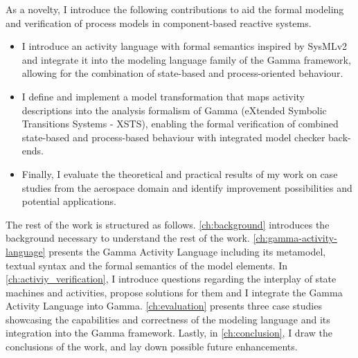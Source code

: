 As a novelty, I introduce the following contributions to aid the formal modeling and verification of process models in component-based reactive systems.

\begin{itemize}
	\item I introduce an activity language with formal semantics inspired by SysMLv2 and integrate it into the modeling language family of the Gamma framework, allowing for the combination of state-based and process-oriented behaviour.
	\item I define and implement a model transformation that maps activity descriptions into the analysis formalism of Gamma (eXtended Symbolic Transitions Systems - XSTS), enabling the formal verification of combined state-based and process-based behaviour with integrated model checker back-ends.
	\item Finally, I evaluate the theoretical and practical results of my work on case studies from the aerospace domain and identify improvement possibilities and potential applications.
\end{itemize}

The rest of the work is structured as follows. \autoref{ch:background} introduces the background necessary to understand the rest of the work. \autoref{ch:gamma-activity-language} presents the Gamma Activity Language including its metamodel, textual syntax and the formal semantics of the model elements. In \autoref{ch:activiy_verification}, I introduce questions regarding the interplay of state machines and activities, propose solutions for them and I integrate the Gamma Activity Language into Gamma. \autoref{ch:evaluation} presents three case studies showcasing the capabilities and correctness of the modeling language and its integration into the Gamma framework. Lastly, in \autoref{ch:conclusion}, I draw the conclusions of the work, and lay down possible future enhancements.